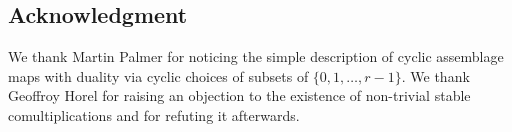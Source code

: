 
\subsection*{Acknowledgment}

We thank Martin Palmer for noticing the simple description of cyclic assemblage maps with duality via cyclic choices of subsets of $\{0,1,\ldots,r-1\}$. We thank Geoffroy Horel for raising an objection to the existence of non-trivial stable comultiplications and for refuting it afterwards.